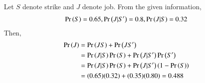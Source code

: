 Let $S$ denote strike and $J$ denote job.  From the given information,
\begin{align}
\Pr\left(S\right) = 0.65, \Pr\left(J|S^{\prime}\right) = 0.8, \Pr\left(J|S\right) = 0.32
\end{align}
Then, 
\begin{align}
\Pr\left(J\right) &= \Pr\left(JS\right)+\Pr\left(JS^{\prime}\right)
\\
&=\Pr\left(J|S\right)\Pr\left(S\right)+\Pr\left(J|S^{\prime}\right)\Pr\left(S^{\prime}\right) 
\\
&=\Pr\left(J|S\right)\Pr\left(S\right)+\Pr\left(J|S^{\prime}\right)\left(1-\Pr\left(S\right)\right) 
\\
& = (0.65)(0.32) + (0.35)(0.80) = 0.488
\end{align}
